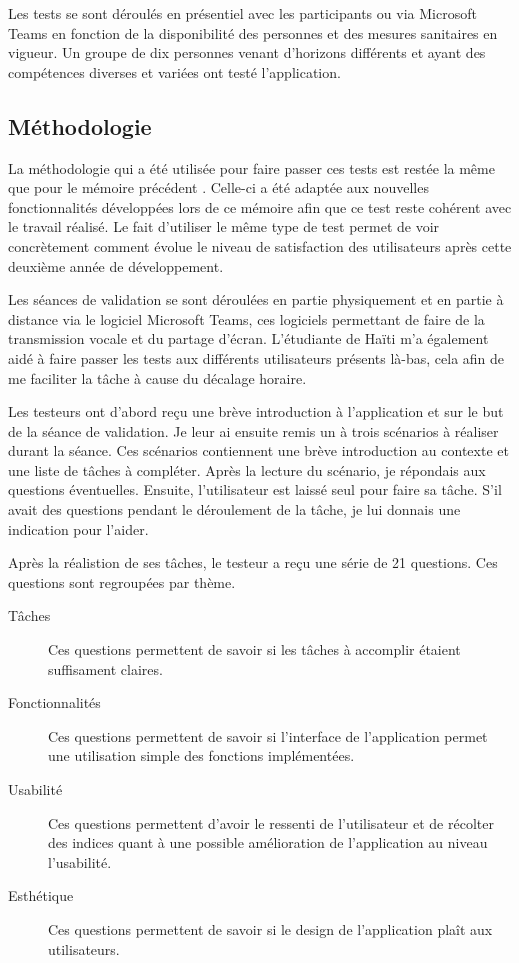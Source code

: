 \documentclass{EPL-master-thesis-covers-FR}
\begin{document}
			Les tests se sont déroulés en présentiel avec les participants ou via Microsoft Teams en fonction de la disponibilité des personnes et des mesures sanitaires en vigueur. Un groupe de dix personnes venant d'horizons différents et ayant des compétences diverses et variées ont testé l'application.


			\subsection*{Méthodologie}
				\label{sec:methodo}
				La méthodologie qui a été utilisée pour faire passer ces tests est restée la même que pour le mémoire précédent \cite{ref:haitiwater}. Celle-ci a été adaptée aux nouvelles fonctionnalités développées lors de ce mémoire afin que ce test reste cohérent avec le travail réalisé. Le fait d'utiliser le même type de test permet de voir concrètement comment évolue le niveau de satisfaction des utilisateurs après cette deuxième année de développement.
				
				Les séances de validation se sont déroulées en partie physiquement et en partie à distance via le logiciel Microsoft Teams, ces logiciels permettant de faire de la transmission vocale et du partage d'écran. L'étudiante de Haïti m'a également aidé à faire passer les tests aux différents utilisateurs présents là-bas, cela afin de me faciliter la tâche à cause du décalage horaire.
				
				Les testeurs ont d'abord reçu une brève introduction à l'application et sur le but de la séance de validation. Je leur ai ensuite remis un à trois scénarios à réaliser durant la séance. Ces scénarios contiennent une brève introduction au contexte et une liste de tâches à compléter. Après la lecture du scénario, je répondais aux questions éventuelles. Ensuite, l'utilisateur est laissé seul pour faire sa tâche. S'il avait des questions pendant le déroulement de la tâche, je lui donnais une indication pour l'aider.
				
				Après la réalistion de ses tâches, le testeur a reçu une série de 21 questions. Ces questions sont regroupées par thème.
				\begin{description}
					\item[Tâches] Ces questions permettent de savoir si les tâches à accomplir étaient suffisament claires.
					\item[Fonctionnalités]  Ces questions permettent de savoir si l'interface de l'application permet une utilisation simple des fonctions implémentées.
					\item[Usabilité] Ces questions permettent d'avoir le ressenti de l'utilisateur et de récolter des indices quant à une possible amélioration de l'application au niveau l'usabilité.
					\item[Esthétique] Ces questions permettent de savoir si le design de l'application plaît aux utilisateurs.
				\end{description}
\end{document}
